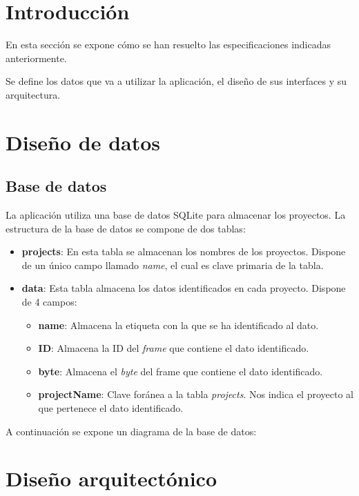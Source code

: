 
\section{Introducción}

En esta sección se expone cómo se han resuelto las especificaciones indicadas anteriormente.

Se define los datos que va a utilizar la aplicación, el diseño de sus interfaces y su arquitectura.

\section{Diseño de datos}

\subsection{Base de datos}

La aplicación utiliza una base de datos SQLite para almacenar los proyectos. La estructura de la base de datos se compone de dos tablas:

\begin{itemize}
\item
\textbf{projects}: En esta tabla se almacenan los nombres de los proyectos. Dispone de un único campo llamado \emph{name}, el cual es clave primaria de la tabla.
\item
\textbf{data}: Esta tabla almacena los datos identificados en cada proyecto. Dispone de 4 campos:
\begin{itemize}
\item
\textbf{name}: Almacena la etiqueta con la que se ha identificado al dato.
\item
\textbf{ID}: Almacena la ID del \emph{frame} que contiene el dato identificado.
\item
\textbf{byte}: Almacena el \emph{byte} del frame que contiene el dato identificado.
\item
\textbf{projectName}: Clave foránea a la tabla \emph{projects}. Nos indica el proyecto al que pertenece el dato identificado.
\end{itemize}
\end{itemize}

A continuación se expone un diagrama de la base de datos:


\section{Diseño arquitectónico}

